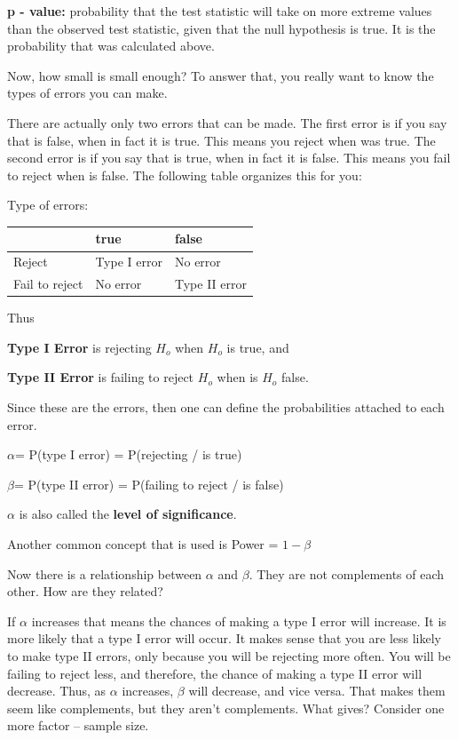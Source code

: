 \documentclass[]{book}
\begin{document}
\textbf{p - value:} probability that the test statistic will take on more extreme values than the observed test statistic, given that the null hypothesis is true. It is the probability that was calculated above.

Now, how small is small enough? To answer that, you really want to know the types of errors you can make.

There are actually only two errors that can be made. The first error is if you say that is false, when in fact it is true. This means you reject when was true. The second error is if you say that is true, when in fact it is false. This means you fail to reject when is false. The following table organizes this for you:

Type of errors:

\begin{longtable}[]{@{}lll@{}}
\toprule
& true & false\tabularnewline
\midrule
\endhead
Reject & Type I error & No error\tabularnewline
Fail to reject & No error & Type II error\tabularnewline
\bottomrule
\end{longtable}

Thus

\textbf{Type I Error} is rejecting \(H_o\) when \(H_o\) is true, and

\textbf{Type II Error} is failing to reject \(H_o\) when is \(H_o\) false.

Since these are the errors, then one can define the probabilities attached to each error.

\(\alpha\)= P(type I error) = P(rejecting / is true)

\(\beta\)= P(type II error) = P(failing to reject / is false)

\(\alpha\) is also called the \textbf{level of significance}.

Another common concept that is used is Power = \(1-\beta\)

Now there is a relationship between \(\alpha\) and \(\beta\). They are not complements of each other. How are they related?

If \(\alpha\) increases that means the chances of making a type I error will increase. It is more likely that a type I error will occur. It makes sense that you are less likely to make type II errors, only because you will be rejecting more often. You will be failing to reject less, and therefore, the chance of making a type II error will decrease. Thus, as \(\alpha\) increases, \(\beta\) will decrease, and vice versa. That makes them seem like complements, but they aren't complements. What gives? Consider one more factor -- sample size.
\end{document}
